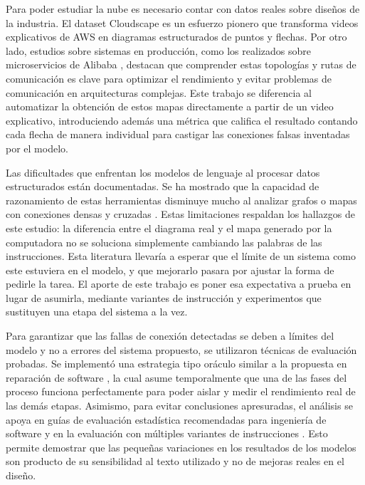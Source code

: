\documentclass[a4paper, twocolumn, 10pt]{IEEEtran}
\begin{document}
 
Para poder estudiar la nube es necesario contar con datos reales sobre diseños de la industria. El dataset Cloudscape \cite{satija2025cloudscape} es un esfuerzo pionero que transforma videos explicativos de AWS en diagramas estructurados de puntos y flechas. Por otro lado, estudios sobre sistemas en producción, como los realizados sobre microservicios de Alibaba \cite{Luo2021AlibabaMicroservices}, destacan que comprender estas topologías y rutas de comunicación es clave para optimizar el rendimiento y evitar problemas de comunicación en arquitecturas complejas. Este trabajo se diferencia al automatizar la obtención de estos mapas directamente a partir de un video explicativo, introduciendo además una métrica que califica el resultado contando cada flecha de manera individual para castigar las conexiones falsas inventadas por el modelo.
 
Las dificultades que enfrentan los modelos de lenguaje al procesar datos estructurados están documentadas. Se ha mostrado que la capacidad de razonamiento de estas herramientas disminuye mucho al analizar grafos o mapas con conexiones densas y cruzadas \cite{Fatemi2024TalkLikeAGraph, Wang2023NLGraph}. Estas limitaciones respaldan los hallazgos de este estudio: la diferencia entre el diagrama real y el mapa generado por la computadora no se soluciona simplemente cambiando las palabras de las instrucciones. Esta literatura llevaría a esperar que el límite de un sistema como este estuviera en el modelo, y que mejorarlo pasara por ajustar la forma de pedirle la tarea. El aporte de este trabajo es poner esa expectativa a prueba en lugar de asumirla, mediante variantes de instrucción y experimentos que sustituyen
una etapa del sistema a la vez.
 
 
Para garantizar que las fallas de conexión detectadas se deben a límites del modelo y no a errores del sistema propuesto, se utilizaron técnicas de evaluación probadas. Se implementó una estrategia tipo oráculo similar a la propuesta en reparación de software \cite{Liu2019FaultLocalizationBias}, la cual asume temporalmente que una de las fases del proceso funciona perfectamente para poder aislar y medir el rendimiento real de las demás etapas. Asimismo, para evitar conclusiones apresuradas, el análisis se apoya en guías de evaluación estadística recomendadas para ingeniería de software \cite{Arcuri2011StatisticalSE} y en la evaluación con múltiples variantes de instrucciones \cite{Mizrahi2024MultiPromptEval}. Esto permite demostrar que las pequeñas variaciones en los resultados de los modelos son producto de su sensibilidad al texto utilizado y no de mejoras reales en el diseño.
\end{document}
